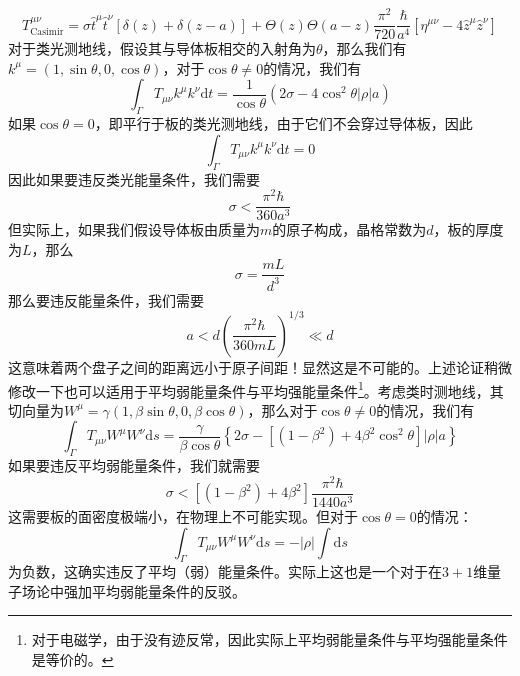 \documentclass[hyperref, UTF8, a4paper]{ctexart}
\begin{document}
\begin{equation*}
	T_{\text{Casimir}}^{\mu \nu } =\sigma \hat{t}^{\mu }\hat{t}^{\nu }[ \delta ( z) +\delta ( z-a)] +\Theta ( z) \Theta ( a-z)\frac{\pi ^{2}}{720}\frac{\hbar }{a^{4}}\left[ \eta ^{\mu \nu } -4\hat{z}^{\mu }\hat{z}^{\nu }\right]
\end{equation*}
对于类光测地线，假设其与导体板相交的入射角为$\theta $，那么我们有$k^{\mu } =( 1,\sin \theta ,0,\cos \theta )$，对于$\cos \theta \neq 0$的情况，我们有
\begin{equation*}
	\int _{\Gamma } T_{\mu \nu } k^{\mu } k^{\nu }\mathrm{d} t=\frac{1}{\cos \theta }\left( 2\sigma -4\cos^{2} \theta | \rho | a\right)
\end{equation*}
如果$\cos \theta =0$，即平行于板的类光测地线，由于它们不会穿过导体板，因此
\begin{equation*}
	\int _{\Gamma } T_{\mu \nu } k^{\mu } k^{\nu }\mathrm{d} t=0
\end{equation*}
因此如果要违反类光能量条件，我们需要
\begin{equation*}
	\sigma < \frac{\pi ^{2} \hbar }{360a^{3}}
\end{equation*}
但实际上，如果我们假设导体板由质量为$m$的原子构成，晶格常数为$d$，板的厚度为$L$，那么
\begin{equation*}
	\sigma =\frac{mL}{d^{3}}
\end{equation*}
那么要违反能量条件，我们需要
\begin{equation*}
	a< d\left(\frac{\pi ^{2} \hbar }{360mL}\right)^{1/3} \ll d
\end{equation*}
这意味着两个盘子之间的距离远小于原子间距！显然这是不可能的。上述论证稍微修改一下也可以适用于平均弱能量条件与平均强能量条件\footnote{对于电磁学，由于没有迹反常，因此实际上平均弱能量条件与平均强能量条件是等价的。}。考虑类时测地线，其切向量为$W^{\mu } =\gamma ( 1,\beta \sin \theta ,0,\beta \cos \theta )$，那么对于$\cos \theta \neq 0$的情况，我们有
\begin{equation*}
	\int _{\Gamma } T_{\mu \nu } W^{\mu } W^{\nu }\mathrm{d} s=\frac{\gamma }{\beta \cos \theta }\left\{2\sigma -\left[\left( 1-\beta ^{2}\right) +4\beta ^{2}\cos^{2} \theta \right]| \rho | a\right\}
\end{equation*}
如果要违反平均弱能量条件，我们就需要
\begin{equation*}
	\sigma < \left[\left( 1-\beta ^{2}\right) +4\beta ^{2}\right]\frac{\pi ^{2} \hbar }{1440a^{3}}
\end{equation*}
这需要板的面密度极端小，在物理上不可能实现。但对于$\cos \theta =0$的情况：
\begin{equation*}
	\int _{\Gamma } T_{\mu \nu } W^{\mu } W^{\nu }\mathrm{d} s=-| \rho | \int \mathrm{d} s
\end{equation*}
为负数，这确实违反了平均（弱）能量条件。实际上这也是一个对于在$3+1$维量子场论中强加平均弱能量条件的反驳。
\end{document}
